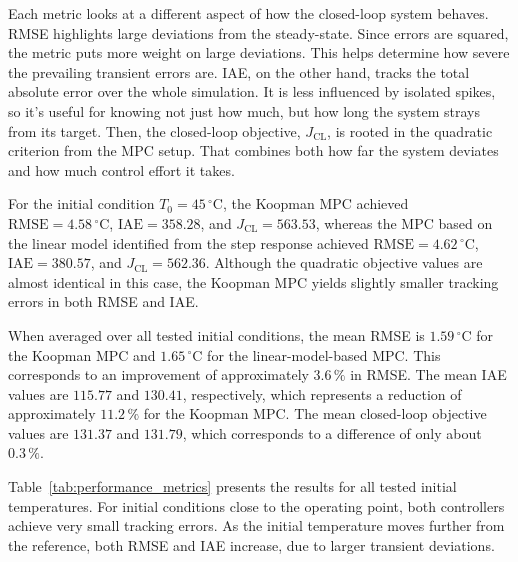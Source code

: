 Each metric looks at a different aspect of how the closed-loop system behaves. RMSE highlights large deviations from the steady-state. Since errors are squared, the metric puts more weight on large deviations. This helps determine how severe the prevailing transient errors are. IAE, on the other hand, tracks the total absolute error over the whole simulation. It is less influenced by isolated spikes, so it's useful for knowing not just how much, but how long the system strays from its target. Then, the closed-loop objective, $J_{\mathrm{CL}}$, is rooted in the quadratic criterion from the MPC setup. That combines both how far the system deviates and how much control effort it takes.

For the initial condition $T_0 = 45\,^{\circ}\mathrm{C}$, the Koopman MPC achieved $\mathrm{RMSE}=4.58\,^{\circ}\mathrm{C}$, $\mathrm{IAE}=358.28$, and $J_{\mathrm{CL}}=563.53$, whereas the MPC based on the linear model identified from the step response achieved $\mathrm{RMSE}=4.62\,^{\circ}\mathrm{C}$, $\mathrm{IAE}=380.57$, and $J_{\mathrm{CL}}=562.36$. Although the quadratic objective values are almost identical in this case, the Koopman MPC yields slightly smaller tracking errors in both RMSE and IAE.

When averaged over all tested initial conditions, the mean RMSE is $1.59\,^{\circ}\mathrm{C}$ for the Koopman MPC and $1.65\,^{\circ}\mathrm{C}$ for the linear-model-based MPC. This corresponds to an improvement of approximately $3.6\,\%$ in RMSE. The mean IAE values are $115.77$ and $130.41$, respectively, which represents a reduction of approximately $11.2\,\%$ for the Koopman MPC. The mean closed-loop objective values are $131.37$ and $131.79$, which corresponds to a difference of only about $0.3\,\%$.

Table~\ref{tab:performance_metrics} presents the results for all tested initial temperatures. For initial conditions close to the operating point, both controllers achieve very small tracking errors. As the initial temperature moves further from the reference, both RMSE and IAE increase, due to larger transient deviations.

